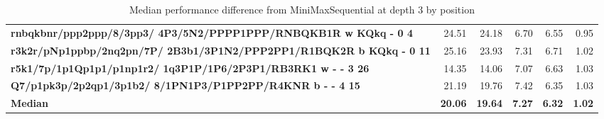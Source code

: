 \begin{table}[H]
{\begin{tabular}{|p{8cm}|*{5}{r|}}
\rowcolor[HTML]{FFFFFF}
\textbf{rnbqkbnr/ppp2ppp/8/3pp3/ 4P3/5N2/PPPP1PPP/RNBQKB1R w KQkq - 0 4}               & 24.51 & 24.18 & 6.70 & 6.55 & 0.95 \\

\rowcolor[HTML]{EFEFEF}
\textbf{r3k2r/pNp1ppbp/2nq2pn/7P/ 2B3b1/3P1N2/PPP2PP1/R1BQK2R b KQkq - 0 11}               & 25.16 & 23.93 & 7.31 & 6.71 & 1.02 \\

\rowcolor[HTML]{FFFFFF}
\textbf{r5k1/7p/1p1Qp1p1/p1np1r2/ 1q3P1P/1P6/2P3P1/RB3RK1 w - - 3 26}               & 14.35 & 14.06 & 7.07 & 6.63 & 1.03 \\

\rowcolor[HTML]{EFEFEF}
\textbf{Q7/p1pk3p/2p2qp1/3p1b2/ 8/1PN1P3/P1PP2PP/R4KNR b - - 4 15}               & 21.19 & 19.76 & 7.42 & 6.35 & 1.03 \\
\hline
\hline
\rowcolor[HTML]{FFFFFF}
\textbf{Median}               & \textbf{20.06} & \textbf{19.64} & \textbf{7.27} & \textbf{6.32} & \textbf{1.02} \\

            \hline
        \end{tabular}%
    }
    \caption{Median performance difference from MiniMaxSequential at depth 3 by position}
    \label{tab:median-performance-difference-from-minimaxsequential-at-depth-3-by-position}
\end{table}
